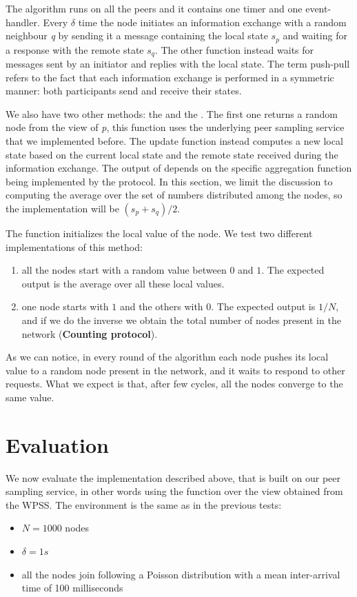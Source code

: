 The algorithm runs on all the peers and it contains one timer and one event-handler. Every $\delta$ time the node initiates an information exchange with a random neighbour \textit{q} by sending it a message containing the local state $s_p$ and waiting for a response with the remote state $s_q$. The other function instead waits for messages sent by an initiator and replies with the local state. The term push-pull refers to the fact that each information exchange is performed in a symmetric manner: both participants send and receive their states.

We also have two other methods: the \getNeighbour and the \update. The first one returns a random node from the view of \textit{p}, this function uses the underlying peer sampling service that we implemented before. The update function instead computes a new local state based on the current local state and the remote state received during the information exchange. The output of \update depends on the specific aggregation function being implemented by the protocol. In this section, we limit the discussion to computing the average over the set of numbers distributed among the nodes, so the implementation will be $(s_p + s_q) / 2$. 

The \init function initializes the local value of the node. We test two different implementations of this method: 
\begin{enumerate}
	\item all the nodes start with a random value between $0$ and $1$. The expected output is the average over all these local values.
	\item one node starts with $1$ and the others with $0$. The expected output is $1/N$, and if we do the inverse we obtain the total number of nodes present in the network (\textbf{Counting protocol}).
\end{enumerate}

As we can notice, in every round of the algorithm each node pushes its local value to a random node present in the network, and it waits to respond to other requests. What we expect is that, after few cycles, all the nodes converge to the same value. 

\section{Evaluation}
\label{sec:evaluation_aggregation}
We now evaluate the implementation described above, that is built on our peer sampling service, in other words using the \getNeighbour function over the view obtained from the WPSS. The environment is the same as in the previous tests:
\begin{itemize}
	\item $N = 1000$ nodes
	\item $\delta = 1s$
	\item all the nodes join following a Poisson distribution with a mean inter-arrival time of 100 milliseconds
\end{itemize}

